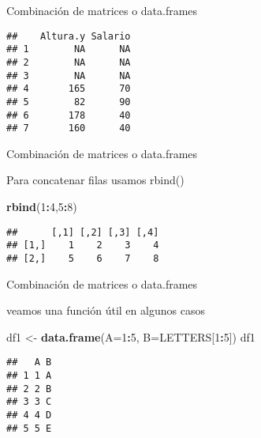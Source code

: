 \documentclass[ignorenonframetext,]{beamer}
\newenvironment{Shaded}{\begin{snugshade}}{\end{snugshade}}
\newcommand{\KeywordTok}[1]{\textcolor[rgb]{0.13,0.29,0.53}{\textbf{#1}}}
\newcommand{\DataTypeTok}[1]{\textcolor[rgb]{0.13,0.29,0.53}{#1}}
\newcommand{\DecValTok}[1]{\textcolor[rgb]{0.00,0.00,0.81}{#1}}
\newcommand{\StringTok}[1]{\textcolor[rgb]{0.31,0.60,0.02}{#1}}
\newcommand{\OperatorTok}[1]{\textcolor[rgb]{0.81,0.36,0.00}{\textbf{#1}}}
\newcommand{\NormalTok}[1]{#1}
\begin{document}
\begin{frame}[fragile]{Combinación de matrices o data.frames}

\begin{verbatim}
##    Altura.y Salario
## 1        NA      NA
## 2        NA      NA
## 3        NA      NA
## 4       165      70
## 5        82      90
## 6       178      40
## 7       160      40
\end{verbatim}


\end{frame}


\begin{frame}[fragile]{Combinación de matrices o data.frames}

Para concatenar filas usamos rbind()

\begin{Shaded}
\begin{Highlighting}[]
\KeywordTok{rbind}\NormalTok{(}\DecValTok{1}\OperatorTok{:}\DecValTok{4}\NormalTok{,}\DecValTok{5}\OperatorTok{:}\DecValTok{8}\NormalTok{)}
\end{Highlighting}
\end{Shaded}

\begin{verbatim}
##      [,1] [,2] [,3] [,4]
## [1,]    1    2    3    4
## [2,]    5    6    7    8
\end{verbatim}

\end{frame}

\begin{frame}[fragile]{Combinación de matrices o data.frames}

veamos una función útil en algunos casos

\begin{Shaded}
\begin{Highlighting}[]
\NormalTok{df1 <-}\StringTok{ }\KeywordTok{data.frame}\NormalTok{(}\DataTypeTok{A=}\DecValTok{1}\OperatorTok{:}\DecValTok{5}\NormalTok{, }\DataTypeTok{B=}\NormalTok{LETTERS[}\DecValTok{1}\OperatorTok{:}\DecValTok{5}\NormalTok{])}
\NormalTok{df1}
\end{Highlighting}
\end{Shaded}

\begin{verbatim}
##   A B
## 1 1 A
## 2 2 B
## 3 3 C
## 4 4 D
## 5 5 E
\end{verbatim}

\end{frame}
\end{document}
